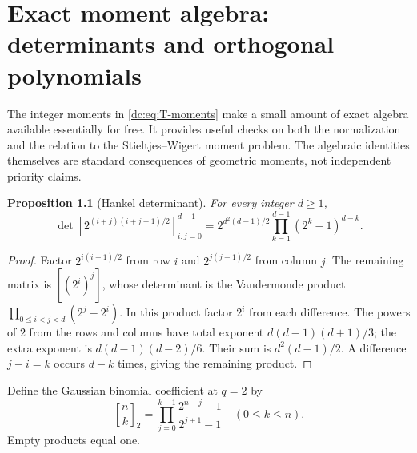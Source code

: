 \documentclass[11pt,a4paper,oneside,openany]{book}
\numberwithin{equation}{chapter}
\newtheorem{proposition}[theorem]{Proposition}
\theoremstyle{definition}
\theoremstyle{remark}
\newcommand{\qbinom}[3]{\genfrac{[}{]}{0pt}{}{#1}{#2}_{#3}}
\begin{document}
\chapter{Exact moment algebra: determinants and orthogonal polynomials}
\label{dc:sec:orthogonal}
The integer moments in \cref{dc:eq:T-moments} make a small amount of
exact algebra available essentially for free. It provides useful
checks on both the normalization and the relation to the
Stieltjes--Wigert moment problem. The algebraic identities themselves
are standard consequences of geometric moments, not independent
priority claims.

\begin{proposition}[Hankel determinant]
\label{dc:prop:determinant}
For every integer $d\ge1$,
\begin{equation}
 \boxed{\displaystyle
 \det\left[2^{(i+j)(i+j+1)/2}\right]_{i,j=0}^{d-1}
 =2^{d^2(d-1)/2}\prod_{k=1}^{d-1}(2^k-1)^{d-k}.}
 \label{dc:eq:hankel-exact}
\end{equation}
\end{proposition}
\begin{proof}
Factor $2^{i(i+1)/2}$ from row $i$ and
$2^{j(j+1)/2}$ from column $j$. The remaining matrix is
$[(2^i)^j]$, whose determinant is the Vandermonde product
$\prod_{0\le i<j<d}(2^j-2^i)$.
In this product factor $2^i$ from each difference. The powers of $2$
from the rows and columns have total exponent
$d(d-1)(d+1)/3$; the extra exponent is
$d(d-1)(d-2)/6$. Their sum is $d^2(d-1)/2$.
A difference $j-i=k$ occurs $d-k$ times, giving the remaining
product.
\end{proof}

Define the Gaussian binomial coefficient at $q=2$ by
\begin{equation}
 \qbinom nk2=\prod_{j=0}^{k-1}
                 \frac{2^{n-j}-1}{2^{j+1}-1}
 \quad(0\le k\le n).
 \label{dc:eq:qbinom}
\end{equation}
Empty products equal one.
\end{document}

